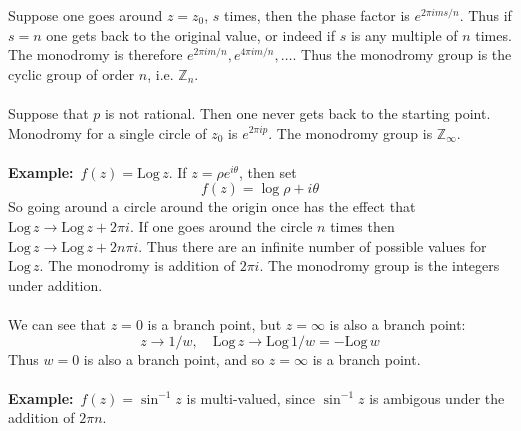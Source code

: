 \documentclass{article}
\newcommand{\example}{\textbf{Example:}}
\newcommand{\Log}{\mathrm{Log} \,}
\begin{document}
Suppose one goes around $z=z_0$, $s$ times, then the phase factor is 
$\displaystyle e^{2 \pi i m s /n}$. Thus if $s=n$ one gets back to the 
original value, or indeed if $s$ is any multiple of $n$ times.
The monodromy is therefore $\displaystyle e^{2\pi i m/n}, e^{4\pi i m/n},
\dots$. Thus the monodromy group is the cyclic group of order $n$, i.e.
$\mathbb{Z}_n$.
\\
\\
Suppose that $p$ is not rational. Then one never gets back to the starting
point. Monodromy for a single circle of $z_0$ is $\displaystyle e^{2\pi ip}$.
The monodromy group is $\mathbb{Z}_{\infty}$.
\\
\\
\example\ $f(z) = \Log z$. If $\displaystyle z = \rho e^{i\theta}$,
then set
\[f(z) = \log \rho + i\theta \]
So going around a circle around the origin once has the effect that
$\displaystyle \Log z \to \Log z + 2\pi i$.
If one goes around the circle $n$ times then 
$\displaystyle \Log z \to \Log z + 2n\pi i$.
Thus there are an infinite number of possible values for $\Log z$.
The monodromy is addition of $2\pi i$. The monodromy group is the 
integers under addition.
\\
\\
We can see that $z=0$ is a branch point, but
$z = \infty$ is also a branch point:
\[z \to 1/w, \quad \Log z \to \Log 1/w = - \Log w \]
Thus $w=0$ is also a branch point, and so $z=\infty$ is a branch point.
\\
\\
\example\ $f(z) = \sin ^{-1} z $ is multi-valued, since $\sin^{-1} z$ is
ambigous under the addition of $2\pi n$. 
\\
\end{document}
